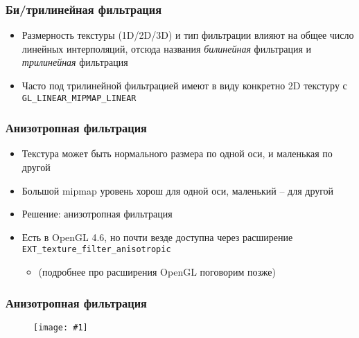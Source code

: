 \documentclass{beamer}
\newcommand{\slideimage}[1]{
  \begin{figure}
    \begin{adjustbox}{width=\textwidth, totalheight=\textheight-2\baselineskip-2\baselineskip,keepaspectratio}
      \texttt{[image: \#1]}
    \end{adjustbox}
  \end{figure}
}
\begin{document}
\begin{frame}[fragile]
\frametitle{Би/трилинейная фильтрация}
\begin{itemize}
\item Размерность текстуры (1D/2D/3D) и тип фильтрации влияют на общее число линейных интерполяций, отсюда названия \textit{билинейная} фильтрация и \textit{трилинейная} фильтрация
\pause
\item Часто под трилинейной фильтрацией имеют в виду конкретно 2D текстуру с \verb|GL_LINEAR_MIPMAP_LINEAR|
\end{itemize}
\end{frame}

\begin{frame}[fragile]
\frametitle{Анизотропная фильтрация}
\begin{itemize}
\item Текстура может быть нормального размера по одной оси, и маленькая по другой
\pause
\item Большой mipmap уровень хорош для одной оси, маленький -- для другой
\pause
\item Решение: анизотропная фильтрация
\pause
\item Есть в OpenGL 4.6, но почти везде доступна через расширение \verb|EXT_texture_filter_anisotropic|
\begin{itemize}
\item (подробнее про расширения OpenGL поговорим позже)
\end{itemize}
\end{itemize}
\end{frame}

\begin{frame}
\frametitle{Анизотропная фильтрация}
\slideimage{anisotropy.png}
\end{frame}
\end{document}
